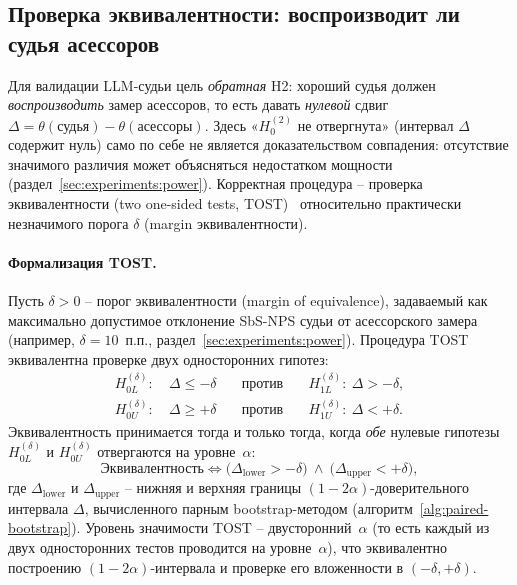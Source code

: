 \subsection{Проверка эквивалентности: воспроизводит ли судья асессоров}
\label{sec:method:bootstrap:equiv}

Для валидации LLM-судьи цель \emph{обратная} H2: хороший судья должен
\emph{воспроизводить} замер асессоров, то есть давать \emph{нулевой}
сдвиг $\Delta = \theta(\text{судья}) - \theta(\text{асессоры})$.
Здесь «$H_0^{(2)}$ не отвергнута» (интервал $\Delta$ содержит нуль) само
по себе не является доказательством совпадения: отсутствие значимого
различия может объясняться недостатком мощности
(раздел~\ref{sec:experiments:power}).
Корректная процедура -- проверка эквивалентности (two one-sided tests,
TOST)~\cite{schuirmann1987tost} относительно практически незначимого
порога $\delta$ (margin эквивалентности).

\paragraph{Формализация TOST.}
Пусть $\delta > 0$ -- порог эквивалентности (margin of equivalence),
задаваемый как максимально допустимое отклонение SbS-NPS судьи от
асессорского замера (например, $\delta = 10$~п.п.,
раздел~\ref{sec:experiments:power}).
Процедура TOST эквивалентна проверке двух односторонних гипотез:
\begin{align}
    \label{eq:tost-lower}
    H_{0L}^{(\delta)}:\ &\Delta \le -\delta
        &\quad \text{против} \quad
        &H_{1L}^{(\delta)}:\ \Delta > -\delta, \\
    \label{eq:tost-upper}
    H_{0U}^{(\delta)}:\ &\Delta \ge +\delta
        &\quad \text{против} \quad
        &H_{1U}^{(\delta)}:\ \Delta < +\delta.
\end{align}
Эквивалентность принимается тогда и только тогда, когда \emph{обе}
нулевые гипотезы $H_{0L}^{(\delta)}$ и $H_{0U}^{(\delta)}$
отвергаются на уровне~$\alpha$:
\begin{equation}
    \label{eq:tost-decision}
    \text{Эквивалентность} \iff
        \bigl(\Delta_{\mathrm{lower}} > -\delta\bigr)
        \ \wedge\
        \bigl(\Delta_{\mathrm{upper}} < +\delta\bigr),
\end{equation}
где $\Delta_{\mathrm{lower}}$ и $\Delta_{\mathrm{upper}}$ --
нижняя и верхняя границы $(1{-}2\alpha)$-доверительного интервала
$\Delta$, вычисленного парным bootstrap-методом
(алгоритм~\ref{alg:paired-bootstrap}).
Уровень значимости TOST -- двусторонний~$\alpha$ (то есть каждый из двух
односторонних тестов проводится на уровне~$\alpha$), что
эквивалентно построению $(1{-}2\alpha)$-интервала и проверке его
вложенности в $(-\delta, +\delta)$.

